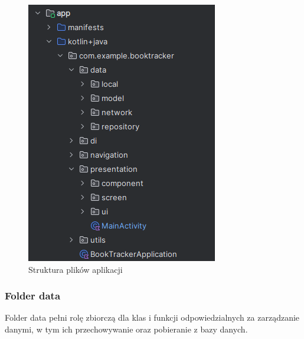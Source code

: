 \documentclass[12pt,twoside]{article}
\begin{document}
\begin{figure}[ht]
	\centering
	\includegraphics{figures/struktura.png}
	\caption{Struktura plików aplikacji}
\label{Fig:struktura}
\end{figure}

\subsubsection{Folder data}

Folder data pełni rolę zbiorczą dla klas i funkcji odpowiedzialnych za zarządzanie danymi, w tym ich przechowywanie 
oraz pobieranie z bazy danych.
\end{document}
